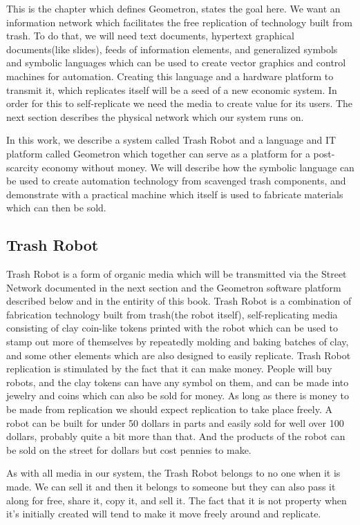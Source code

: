 This is the chapter which defines Geometron, states the goal here.  We want an information network which facilitates the free replication of technology built from trash.  To do that, we will need text documents, hypertext graphical documents(like slides), feeds of information elements, and generalized symbols and symbolic languages which can be used to create vector graphics and control machines for automation.  Creating this language and a hardware platform to transmit it, which replicates itself will be a seed of a new economic system.  In order for this to self-replicate we need the media to create value for its users.  The next section describes the physical network which our system runs on.   

In this work, we describe a system called Trash Robot and a language and IT platform called Geometron which together can serve as a platform for a post-scarcity economy without money.  We will describe how the symbolic language can be used to create automation technology from scavenged trash components, and demonstrate with a practical machine which itself is used to fabricate materials which can then be sold.  

\subsection{Trash Robot}

Trash Robot is a form of organic media which will be transmitted via the Street Network documented in the next section and the Geometron software platform described below and in the entirity of this book.  Trash Robot is a combination of fabrication technology built from trash(the robot itself), self-replicating media consisting of clay coin-like tokens printed with the robot which can be used to stamp out more of themselves by repeatedly molding and baking batches of clay, and some other elements which are also designed to easily replicate.  Trash Robot replication is stimulated by the fact that it can make money.  People will buy robots, and the clay tokens can have any symbol on them, and can be made into jewelry and coins which can also be sold for money.  As long as there is money to be made from replication we should expect replication to take place freely.  A robot can be built for under 50 dollars in parts and easily sold for well over 100 dollars, probably quite a bit more than that.  And the products of the robot can be sold on the street for dollars but cost pennies to make.  

As with all media in our system, the Trash Robot belongs to no one when it is made.  We can sell it and then it belongs to someone but they can also pass it along for free, share it, copy it, and sell it.  The fact that it is not property when it's initially created will tend to make it move freely around and replicate.

